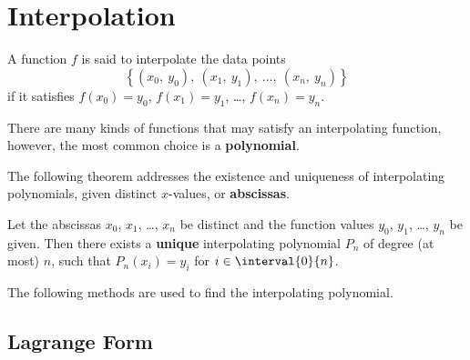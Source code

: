 \documentclass{article}
\begin{document}
\section{Interpolation}
\begin{definition}
    A function \(f\) is said to interpolate the data points
    \begin{equation*}
        \left\{ \left( x_0,\: y_0 \right),\: \left( x_1,\: y_1 \right),\: \dots,\: \left( x_n,\: y_n \right) \right\}
    \end{equation*}
    if it satisfies \(f\left( x_0 \right) = y_0\), \(f\left( x_1 \right) = y_1\), \dots,  \(f\left( x_n \right) = y_n\).
\end{definition}
There are many kinds of functions that may satisfy an interpolating function, however, the most common choice is a
\textbf{polynomial}.

The following theorem addresses the existence and uniqueness of interpolating polynomials, given distinct \(x\)-values, or \textbf{abscissas}.
\begin{theorem}
    Let the abscissas \(x_0\), \(x_1\), \dots, \(x_n\) be distinct and the function values \(y_0\), \(y_1\), \dots, \(y_n\)
    be given. Then there exists a \textbf{unique} interpolating polynomial \(P_n\) of degree (at most) \(n\), such that
    \(P_n\left( x_i \right) = y_i\) for \(i \in \interval{0}{n}\).
\end{theorem}
The following methods are used to find the interpolating polynomial.
\subsection{Lagrange Form}
\end{document}
